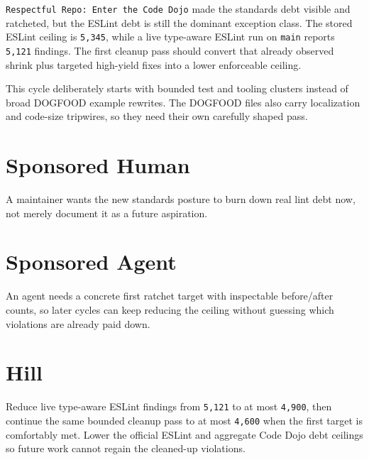 \texttt{R\allowbreak{}e\allowbreak{}s\allowbreak{}p\allowbreak{}e\allowbreak{}c\allowbreak{}t\allowbreak{}f\allowbreak{}u\allowbreak{}l\allowbreak{} \allowbreak{}R\allowbreak{}e\allowbreak{}p\allowbreak{}o\allowbreak{}:\allowbreak{} \allowbreak{}E\allowbreak{}n\allowbreak{}t\allowbreak{}e\allowbreak{}r\allowbreak{} \allowbreak{}t\allowbreak{}h\allowbreak{}e\allowbreak{} \allowbreak{}C\allowbreak{}o\allowbreak{}d\allowbreak{}e\allowbreak{} \allowbreak{}D\allowbreak{}o\allowbreak{}j\allowbreak{}o} made the standards debt visible and ratcheted, but the ESLint debt is still the dominant exception class. The stored ESLint ceiling is \texttt{5\allowbreak{},\allowbreak{}3\allowbreak{}4\allowbreak{}5}, while a live type-aware ESLint run on \texttt{m\allowbreak{}a\allowbreak{}i\allowbreak{}n} reports \texttt{5\allowbreak{},\allowbreak{}1\allowbreak{}2\allowbreak{}1} findings. The first cleanup pass should convert that already observed shrink plus targeted high-yield fixes into a lower enforceable ceiling.

This cycle deliberately starts with bounded test and tooling clusters instead of broad DOGFOOD example rewrites. The DOGFOOD files also carry localization and code-size tripwires, so they need their own carefully shaped pass.

\section{Sponsored Human}\label{record-216-sponsored-human}

A maintainer wants the new standards posture to burn down real lint debt now, not merely document it as a future aspiration.

\section{Sponsored Agent}\label{record-216-sponsored-agent}

An agent needs a concrete first ratchet target with inspectable before/after counts, so later cycles can keep reducing the ceiling without guessing which violations are already paid down.

\section{Hill}\label{record-216-hill}

Reduce live type-aware ESLint findings from \texttt{5\allowbreak{},\allowbreak{}1\allowbreak{}2\allowbreak{}1} to at most \texttt{4\allowbreak{},\allowbreak{}9\allowbreak{}0\allowbreak{}0}, then continue the same bounded cleanup pass to at most \texttt{4\allowbreak{},\allowbreak{}6\allowbreak{}0\allowbreak{}0} when the first target is comfortably met. Lower the official ESLint and aggregate Code Dojo debt ceilings so future work cannot regain the cleaned-up violations.

